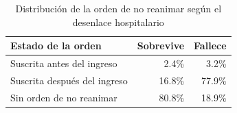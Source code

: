 \begin{table}[H]
\centering
\caption{Distribución de la orden de no reanimar según el desenlace hospitalario}
\label{tab:dnr}
\small
\begin{tabular}{p{5cm} r r}
\toprule
\textbf{Estado de la orden} & \textbf{Sobrevive} & \textbf{Fallece} \\
\midrule
Suscrita antes del ingreso & 2.4\% & 3.2\% \\
Suscrita después del ingreso & 16.8\% & 77.9\% \\
Sin orden de no reanimar & 80.8\% & 18.9\% \\
\bottomrule
\end{tabular}
\end{table}
